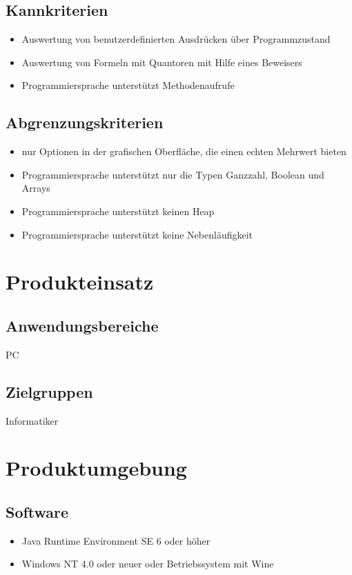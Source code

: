 \documentclass[a4paper,10pt]{article}
\begin{document}
\subsection{Kannkriterien}
\begin{itemize}
  \item Auswertung von benutzerdefinierten Ausdrücken über Programmzustand
  \item Auswertung von Formeln mit Quantoren mit Hilfe eines Beweisers
  \item Programmiersprache unterstützt Methodenaufrufe
\end{itemize}

\subsection{Abgrenzungskriterien}
\begin{itemize}
  \item nur Optionen in der grafischen Oberfläche, die einen echten Mehrwert
  bieten
  \item Programmiersprache unterstützt nur die Typen Ganzzahl, Boolean und
  Arrays
  \item Programmiersprache unterstützt keinen Heap
  \item Programmiersprache unterstützt keine Nebenläufigkeit
\end{itemize}

\section{Produkteinsatz}

\subsection{Anwendungsbereiche}
PC

\subsection{Zielgruppen}
Informatiker

\section{Produktumgebung}
\subsection{Software}
\begin{itemize}
  \item Java Runtime Environment SE 6 oder höher
  \item Windows NT 4.0 oder neuer oder Betriebssystem mit Wine
\end{itemize}
\end{document}
